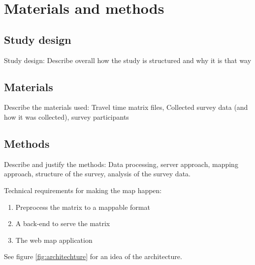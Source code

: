 \section{Materials and methods}

\subsection{Study design}
Study design: Describe overall how the study is structured and why it is that way




\subsection{Materials}
Describe the materials used: Travel time matrix files, Collected survey data (and how it was collected), survey participants

\subsection{Methods}
Describe and justify the methods:
Data processing,
server approach,
mapping approach,
structure of the survey,
analysis of the survey data.

Technical requirements for making the map happen:
\begin{enumerate}
	\item Preprocess the matrix to a mappable format
	\item A back-end to serve the matrix
	\item The web map application
\end{enumerate}

See figure \ref{fig:architechture} for an idea of the architecture.

